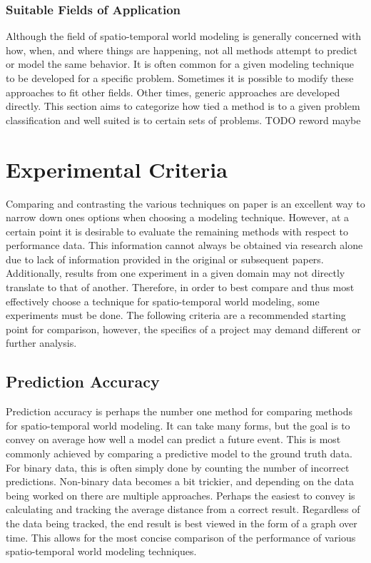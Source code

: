   \subsubsection{ Suitable Fields of Application }
  Although the field of spatio-temporal world modeling is generally concerned
  with how, when, and where things are happening, not all methods attempt to
  predict or model the same behavior. It is often common for a given modeling
  technique to be developed for a specific problem. Sometimes it is possible to
  modify these approaches to fit other fields. Other times, generic
  approaches are developed directly. This section aims to categorize how tied
  a method is to a given problem classification and well suited is to certain
  sets of problems. TODO reword maybe


  \section{ Experimental Criteria }

  Comparing and contrasting the various techniques on paper is an excellent way
  to narrow down ones options when choosing a modeling technique. However, at
  a certain point it is desirable to evaluate the remaining methods with
  respect to performance data. This information cannot always be obtained via
  research alone due to lack of information provided in the original or
  subsequent papers. Additionally, results from  one experiment in a given domain
  may not directly translate to that of another. Therefore, in order to best
  compare and thus most effectively choose a technique for spatio-temporal
  world modeling, some experiments must be done. The following criteria are
  a recommended starting point for comparison, however, the specifics of a
  project may demand different or further analysis.

  \subsection{ Prediction Accuracy }
  Prediction accuracy is perhaps the number one method for comparing methods
  for spatio-temporal world modeling. It can take many forms, but the goal is
  to convey on average how well a model can predict a future event. This is
  most commonly achieved by comparing a predictive model to the ground truth
  data. For binary data, this is often simply done by counting the number of
  incorrect predictions. Non-binary data becomes a bit trickier, and depending
  on the data being worked on there are multiple approaches. Perhaps the easiest
  to convey is calculating and tracking the average distance from a correct
  result. Regardless of the data being tracked, the end result is best viewed
  in the form of a graph over time. This allows for the most concise comparison
  of the performance of various spatio-temporal world modeling techniques.


